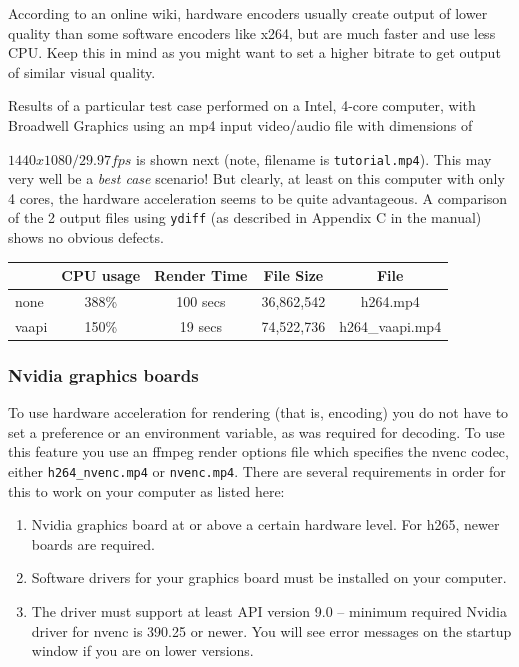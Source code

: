 According to an online wiki, hardware encoders usually create output of lower quality than some software encoders like x264, but are much faster and use less CPU. Keep this in mind as you might want to set a higher bitrate to get output of similar visual quality.

Results of a particular test case performed on a Intel, 4-core computer, with Broadwell Graphics using an mp4 input video/audio file with dimensions of

$1440x1080 / 29.97fps$ is shown next (note, filename is \texttt{tutorial.mp4}).  This may very well be a \textit{best case} scenario!  But clearly, at least on this computer with only 4 cores, the hardware acceleration seems to be quite advantageous.  A comparison of the 2 output files using \texttt{ydiff} (as described in Appendix C in the manual) shows no obvious defects.

\begin{center}
	\begin{tabular}{l|cccc}
		&CPU usage & Render Time & File Size & File \\
		\hline
		none & 388\% &100 secs &36,862,542 & h264.mp4 \\
		vaapi & 150\% & 19 secs & 74,522,736 & h264\_vaapi.mp4 \\
	\end{tabular}
\end{center}

\subsubsection*{Nvidia graphics boards}%
\label{ssub:nvidia_graphics_card}

To use hardware acceleration for rendering (that is, encoding) you do not have to set a preference or an environment variable, as was required for decoding.  To use this feature you use an ffmpeg render options file which specifies the nvenc codec, either \texttt{h264\_nvenc.mp4} or \texttt{nvenc.mp4}.  There are several requirements in order for this to work on your computer as listed here:

\begin{enumerate}
	\item Nvidia graphics board at or above a certain hardware level.  For h265, newer boards are required.
	\item Software drivers for your graphics board must be installed on your computer.
	\item The driver must support at least API version 9.0 -- minimum required Nvidia driver for nvenc is
	390.25 or newer.  You will see error messages on the startup window if you are on lower versions.
\end{enumerate}

